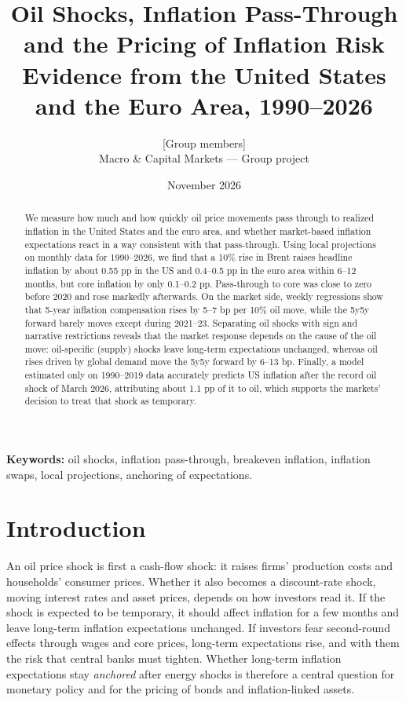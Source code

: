 \documentclass[11pt,a4paper]{article}
\title{\textbf{Oil Shocks, Inflation Pass-Through and the Pricing of Inflation Risk}\\[0.3em]
\large Evidence from the United States and the Euro Area, 1990--2026}
\author{[Group members]\\[0.2em] \small Macro \& Capital Markets --- Group project}
\date{November 2026}
\begin{document}
\maketitle

\begin{abstract}
\noindent We measure how much and how quickly oil price movements pass through to realized inflation in the United States and the euro area, and whether market-based inflation expectations react in a way consistent with that pass-through. Using local projections on monthly data for 1990--2026, we find that a 10\% rise in Brent raises headline inflation by about 0.55 pp in the US and 0.4--0.5 pp in the euro area within 6--12 months, but core inflation by only 0.1--0.2 pp. Pass-through to core was close to zero before 2020 and rose markedly afterwards. On the market side, weekly regressions show that 5-year inflation compensation rises by 5--7 bp per 10\% oil move, while the 5y5y forward barely moves except during 2021--23. Separating oil shocks with sign and narrative restrictions reveals that the market response depends on the cause of the oil move: oil-specific (supply) shocks leave long-term expectations unchanged, whereas oil rises driven by global demand move the 5y5y forward by 6--13 bp. Finally, a model estimated only on 1990--2019 data accurately predicts US inflation after the record oil shock of March 2026, attributing about 1.1 pp of it to oil, which supports the markets' decision to treat that shock as temporary.
\end{abstract}

\vspace{0.5em}
\noindent\textbf{Keywords:} oil shocks, inflation pass-through, breakeven inflation, inflation swaps, local projections, anchoring of expectations.

\section{Introduction}

An oil price shock is first a cash-flow shock: it raises firms' production costs and households' consumer prices. Whether it also becomes a discount-rate shock, moving interest rates and asset prices, depends on how investors read it. If the shock is expected to be temporary, it should affect inflation for a few months and leave long-term inflation expectations unchanged. If investors fear second-round effects through wages and core prices, long-term expectations rise, and with them the risk that central banks must tighten. Whether long-term inflation expectations stay \emph{anchored} after energy shocks is therefore a central question for monetary policy and for the pricing of bonds and inflation-linked assets.
\end{document}
